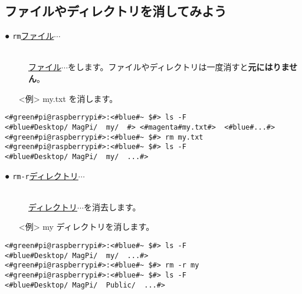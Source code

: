 \subsection{ファイルやディレクトリを消してみよう}
\begin{description}
\item[● \texttt{rm}\textvisiblespace \underline{ファイル}$\cdots$]\mbox{}\\
\underline{ファイル}$\cdots$をします。ファイルやディレクトリは一度消すと\textbf{元にはりません}。
\end{description}
\begin{itemize}
\item[<例>]my.txt を消します。
\end{itemize}
\begin{lstlisting}[caption=cpの例, label=cp]
<#green#pi@raspberrypi#>:<#blue#~ $#> ls -F
<#blue#Desktop/	MagPi/	my/	 #>	<#magenta#my.txt#>	<#blue#...#>
<#green#pi@raspberrypi#>:<#blue#~ $#> rm my.txt
<#green#pi@raspberrypi#>:<#blue#~ $#> ls -F
<#blue#Desktop/	MagPi/	my/	 ...#>
\end{lstlisting}
\begin{description}
\item[● \texttt{rm}\textvisiblespace \texttt{-r}\textvisiblespace \underline{ディレクトリ}$\cdots$]\mbox{}\\
\underline{ディレクトリ}$\cdots$を消去します。
\end{description}
\begin{itemize}
\item[<例>]my ディレクトリを消します。
\end{itemize}
\begin{lstlisting}[caption=cp -rの例, label=cp-R]
<#green#pi@raspberrypi#>:<#blue#~ $#> ls -F
<#blue#Desktop/	MagPi/	my/	 ...#>
<#green#pi@raspberrypi#>:<#blue#~ $#> rm -r my
<#green#pi@raspberrypi#>:<#blue#~ $#> ls -F
<#blue#Desktop/	MagPi/	Public/	 ...#>
\end{lstlisting}

